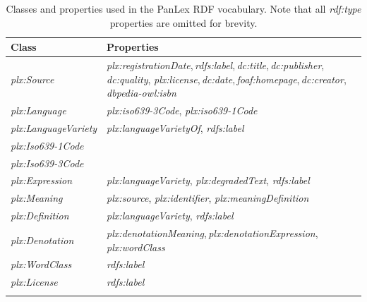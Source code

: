 \documentclass[sw]{iosart2c}
\begin{document}
\begin{table}
  \centering
  \begin{scriptsize}
  \fontsize{5.8pt}{5pt}\selectfont
  \begin{tabular}{p{41pt}p{150pt}}
    Class                 & Properties \\
    \toprule
    \emph{plx:Source} & \emph{plx:registrationDate},\,\emph{rdfs:label},\,\emph{dc:title},\,\emph{dc:publisher},\,\emph{dc:quality}, \emph{plx:license},\,\emph{dc:date},\,\emph{foaf:homepage},\,\emph{dc:creator},\,\mbox{\emph{dbpedia-owl:isbn}} \\
    \midrule
    \emph{plx:Language} & \emph{plx:iso639-3Code}, \emph{plx:iso639-1Code} \\
    \midrule
    \emph{plx:LanguageVariety}
                          & \emph{plx:languageVarietyOf}, \emph{rdfs:label} \\
    \midrule
    \mbox{\emph{plx:Iso639-1Code}} & \\
    \midrule
    \mbox{\emph{plx:Iso639-3Code}} & \\
    \midrule
    \emph{plx:Expression}
                          & \emph{plx:languageVariety}, \emph{plx:degradedText}, \emph{rdfs:label} \\
    \midrule
    \emph{plx:Meaning}
                          & \emph{plx:source}, \emph{plx:identifier}, \emph{plx:meaningDefinition} \\
    \midrule
    \emph{plx:Definition}
                          & \emph{plx:languageVariety}, \emph{rdfs:label} \\
    \midrule
    \emph{plx:Denotation}
                          & \emph{plx:denotationMeaning},\,\emph{plx:denotationExpression},\,\emph{plx:wordClass} \\
    \midrule
    \emph{plx:WordClass}  
                          & \emph{rdfs:label} \\
    \midrule
    \emph{plx:License}    & \emph{rdfs:label} \\
    \bottomrule\vspace{3pt}
  \end{tabular}
  \end{scriptsize}
  \caption{Classes and properties used in the PanLex RDF vocabulary. Note that all \emph{rdf:type} properties are omitted for brevity.}
  \label{tbl:vocabulary}
\end{table}
\end{document}
